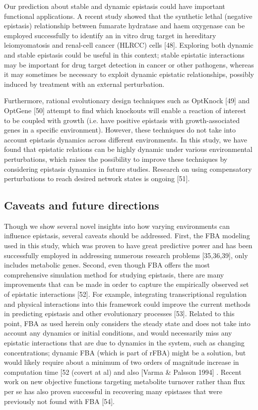 Our prediction about stable and dynamic epistasis could have important
functional applications. A recent study showed that the synthetic
lethal (negative epistasis) relationship between fumarate hydratase
and haem oxygenase can be employed successfully to identify an in
vitro drug target in hereditary leiomyomatosis and renal-cell cancer
(HLRCC) cells [48]. Exploring both dynamic and stable epistasis could
be useful in this context; stable epistatic interactions may be
important for drug target detection in cancer or other pathogens,
whereas it may sometimes be necessary to exploit dynamic epistatic
relationships, possibly induced by treatment with an external
perturbation.

Furthermore, rational evolutionary design techniques such as OptKnock
[49] and OptGene [50] attempt to find which knockouts will enable a
reaction of interest to be coupled with growth (i.e. have positive
epistasis with growth-associated genes in a specific
environment). However, these techniques do not take into account
epistasis dynamics across different environments. In this study, we
have found that epistatic relations can be highly dynamic under
various environmental perturbations, which raises the possibility to
improve these techniques by considering epistasis dynamics in future
studies. Research on using compensatory perturbations to reach desired
network states is ongoing [51].

\subsection{Caveats and future directions} Though we show several
novel insights into how varying environments can influence epistasis,
several caveats should be addressed. First, the FBA modeling used in
this study, which was proven to have great predictive power and has
been successfully employed in addressing numerous research problems
[35,36,39], only includes metabolic genes. Second, even though FBA
offers the most comprehensive simulation method for studying
epistasis, there are many improvements that can be made in order to
capture the empirically observed set of epistatic interactions
[52]. For example, integrating transcriptional regulation and physical
interactions into this framework could improve the current methods in
predicting epistasis and other evolutionary processes [53]. Related to
this point, FBA as used herein only considers the steady state and
does not take into account any dynamics or initial conditions, and
would necessarily miss any epistatic interactions that are due to
dynamics in the system, such as changing concentrations; dynamic FBA
(which is part of rFBA) might be a solution, but would likely require
about a minimum of two orders of magnitude increase in computation
time [52 (covert at al) and also [Varma & Palsson 1994] . Recent work
on new objective functions targeting metabolite turnover rather than
flux per se has also proven successful in recovering many epistases
that were previously not found with FBA [54].

